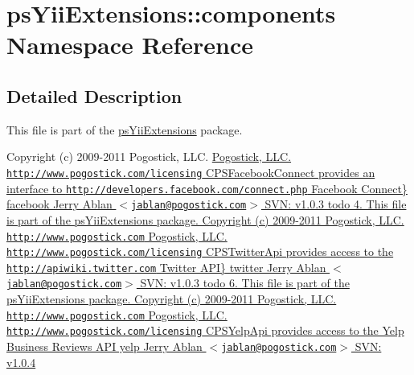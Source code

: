 \hypertarget{namespacepsYiiExtensions_1_1components}{
\section{psYiiExtensions::components Namespace Reference}
\label{namespacepsYiiExtensions_1_1components}
}


\subsection{Detailed Description}
This file is part of the \hyperlink{namespacepsYiiExtensions}{psYiiExtensions} package.

Copyright (c) 2009-\/2011 Pogostick, LLC. \hyperlink{}{Pogostick, LLC.  \href{http://www.pogostick.com/licensing}{\tt http://www.pogostick.com/licensing} CPSFacebookConnect provides an interface to  \href{http://developers.facebook.com/connect.php}{\tt http://developers.facebook.com/connect.php} Facebook Connect\}   facebook   Jerry Ablan $<$\href{mailto:jablan@pogostick.com}{\tt jablan@pogostick.com}$>$  SVN:   v1.0.3    todo 4.  This file is part of the psYiiExtensions package.   Copyright (c) 2009-\/2011 Pogostick, LLC.  \href{http://www.pogostick.com}{\tt http://www.pogostick.com} Pogostick, LLC.  \href{http://www.pogostick.com/licensing}{\tt http://www.pogostick.com/licensing} CPSTwitterApi provides access to the  \href{http://apiwiki.twitter.com}{\tt http://apiwiki.twitter.com} Twitter API\}   twitter   Jerry Ablan $<$\href{mailto:jablan@pogostick.com}{\tt jablan@pogostick.com}$>$  SVN:   v1.0.3    todo 6.  This file is part of the psYiiExtensions package.   Copyright (c) 2009-\/2011 Pogostick, LLC.  \href{http://www.pogostick.com}{\tt http://www.pogostick.com} Pogostick, LLC.  \href{http://www.pogostick.com/licensing}{\tt http://www.pogostick.com/licensing} CPSYelpApi provides access to the Yelp Business Reviews API   yelp   Jerry Ablan $<$\href{mailto:jablan@pogostick.com}{\tt jablan@pogostick.com}$>$  SVN:   v1.0.4   }
